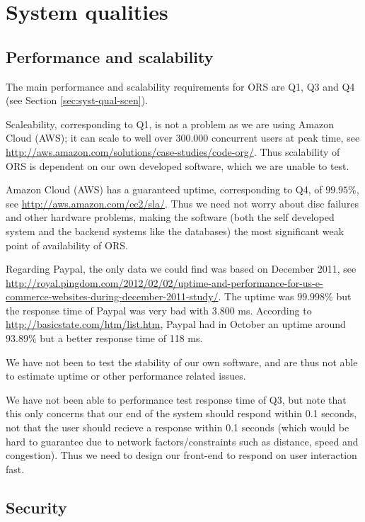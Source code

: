 \chapter{System qualities}
\label{cha:system-qualities}
\thispagestyle{fancy}


\section{Performance and scalability}
\label{sec:perf-scal}
The main performance and scalability requirements for ORS are Q1, Q3 and Q4 (see Section \ref{sec:syst-qual-scen}).

Scaleability, corresponding to Q1, is not a problem as we are using Amazon Cloud (AWS); it can scale to well over 300.000 concurrent users at peak time, see \url{http://aws.amazon.com/solutions/case-studies/code-org/}. Thus scalability of ORS is dependent on our own developed software, which we are unable to test.

Amazon Cloud (AWS) has a guaranteed uptime, corresponding to Q4, of $99.95\%$, see \url{http://aws.amazon.com/ec2/sla/}. Thus we need not worry about disc failures and other hardware problems, making the software (both the self developed system and the backend systems like the databases) the most significant weak point of availability of ORS.

Regarding Paypal, the only data we could find was based on December 2011, see \url{http://royal.pingdom.com/2012/02/02/uptime-and-performance-for-us-e-commerce-websites-during-december-2011-study/}. The uptime was $99.998\%$ but the response time of Paypal was very bad with 3.800 ms. According to \url{http://basicstate.com/htm/list.htm}, Paypal had in October an uptime around $93.89\%$ but a better response time of 118 ms.

We have not been to test the stability of our own software, and are thus not able to estimate uptime or other performance related issues.

We have not been able to performance test response time of Q3, but note that this only concerns that our end of the system should respond within 0.1 seconds, not that the user should recieve a response within 0.1 seconds (which would be hard to guarantee due to network factors/constraints such as distance, speed and congestion). Thus we need to design our front-end to respond on user interaction fast.


\section{Security}
\label{sec:security}



